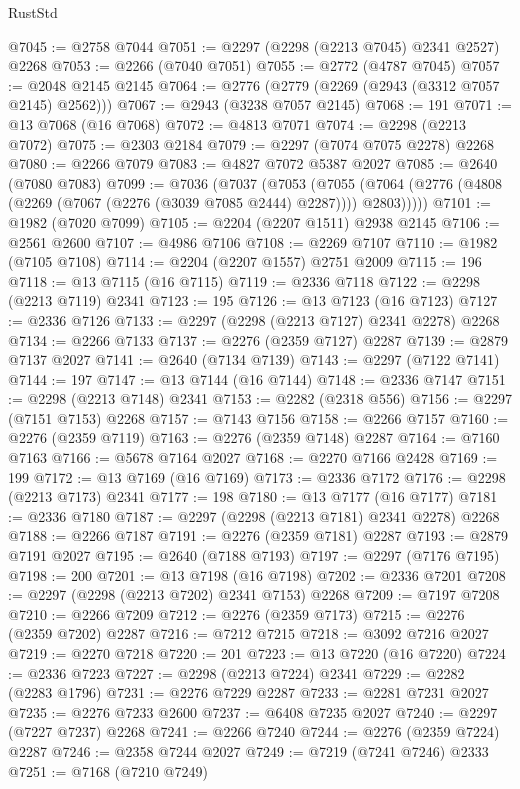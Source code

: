 \begin{lexlean}{RustStd}
\begin{coremodule}
{\begin{coremodule}
{{{{{{{{{{{{{{{{{{{{{{{{{{{{{{{{{{{{{{{{{{{{{{{{{{{{{{@7045 := @2758 @7044
@7051 := @2297 (@2298 (@2213 @7045) @2341 @2527) @2268
@7053 := @2266 (@7040 @7051)
@7055 := @2772 (@4787 @7045)
@7057 := @2048 @2145 @2145
@7064 := @2776 (@2779 (@2269 (@2943 (@3312 @7057 @2145) @2562)))
@7067 := @2943 (@3238 @7057 @2145)
@7068 := 191
@7071 := @13 @7068 (@16 @7068)
@7072 := @4813 @7071
@7074 := @2298 (@2213 @7072)
@7075 := @2303 @2184
@7079 := @2297 (@7074 @7075 @2278) @2268
@7080 := @2266 @7079
@7083 := @4827 @7072 @5387 @2027
@7085 := @2640 (@7080 @7083)
@7099 := @7036
    (@7037
      (@7053
        (@7055 (@7064 (@2776 (@4808 (@2269 (@7067 (@2276 (@3039 @7085 @2444) @2287)))) @2803)))))
@7101 := @1982 (@7020 @7099)
@7105 := @2204 (@2207 @1511) @2938 @2145
@7106 := @2561 @2600
@7107 := @4986 @7106
@7108 := @2269 @7107
@7110 := @1982 (@7105 @7108)
@7114 := @2204 (@2207 @1557) @2751 @2009
@7115 := 196
@7118 := @13 @7115 (@16 @7115)
@7119 := @2336 @7118
@7122 := @2298 (@2213 @7119) @2341
@7123 := 195
@7126 := @13 @7123 (@16 @7123)
@7127 := @2336 @7126
@7133 := @2297 (@2298 (@2213 @7127) @2341 @2278) @2268
@7134 := @2266 @7133
@7137 := @2276 (@2359 @7127) @2287
@7139 := @2879 @7137 @2027
@7141 := @2640 (@7134 @7139)
@7143 := @2297 (@7122 @7141)
@7144 := 197
@7147 := @13 @7144 (@16 @7144)
@7148 := @2336 @7147
@7151 := @2298 (@2213 @7148) @2341
@7153 := @2282 (@2318 @556)
@7156 := @2297 (@7151 @7153) @2268
@7157 := @7143 @7156
@7158 := @2266 @7157
@7160 := @2276 (@2359 @7119)
@7163 := @2276 (@2359 @7148) @2287
@7164 := @7160 @7163
@7166 := @5678 @7164 @2027
@7168 := @2270 @7166 @2428
@7169 := 199
@7172 := @13 @7169 (@16 @7169)
@7173 := @2336 @7172
@7176 := @2298 (@2213 @7173) @2341
@7177 := 198
@7180 := @13 @7177 (@16 @7177)
@7181 := @2336 @7180
@7187 := @2297 (@2298 (@2213 @7181) @2341 @2278) @2268
@7188 := @2266 @7187
@7191 := @2276 (@2359 @7181) @2287
@7193 := @2879 @7191 @2027
@7195 := @2640 (@7188 @7193)
@7197 := @2297 (@7176 @7195)
@7198 := 200
@7201 := @13 @7198 (@16 @7198)
@7202 := @2336 @7201
@7208 := @2297 (@2298 (@2213 @7202) @2341 @7153) @2268
@7209 := @7197 @7208
@7210 := @2266 @7209
@7212 := @2276 (@2359 @7173)
@7215 := @2276 (@2359 @7202) @2287
@7216 := @7212 @7215
@7218 := @3092 @7216 @2027
@7219 := @2270 @7218
@7220 := 201
@7223 := @13 @7220 (@16 @7220)
@7224 := @2336 @7223
@7227 := @2298 (@2213 @7224) @2341
@7229 := @2282 (@2283 @1796)
@7231 := @2276 @7229 @2287
@7233 := @2281 @7231 @2027
@7235 := @2276 @7233 @2600
@7237 := @6408 @7235 @2027
@7240 := @2297 (@7227 @7237) @2268
@7241 := @2266 @7240
@7244 := @2276 (@2359 @7224) @2287
@7246 := @2358 @7244 @2027
@7249 := @7219 (@7241 @7246) @2333
@7251 := @7168 (@7210 @7249)
}}}}}}}}}}}}}}}}}}}}}}}}}}}}}}}}}}}}}}}}}}}}}}}}}}}}}}
\end{coremodule}}
\end{coremodule}
\end{lexlean}
